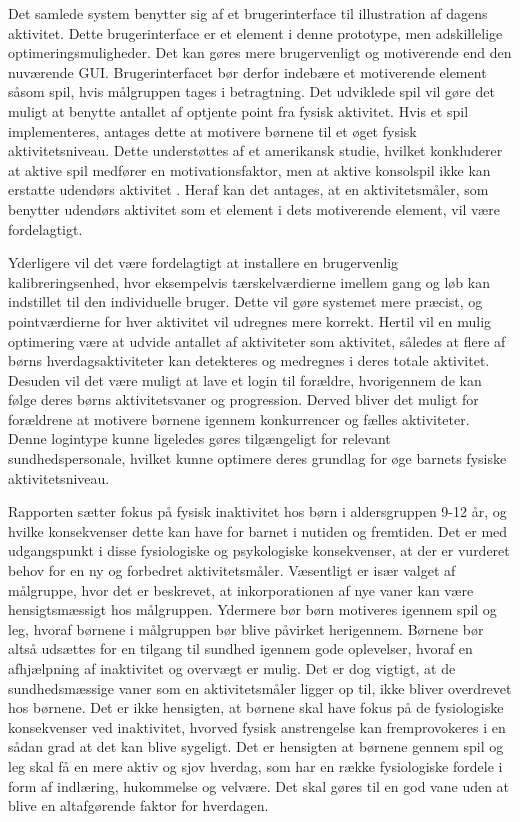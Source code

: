 Det samlede system benytter sig af et brugerinterface til illustration af dagens aktivitet. Dette brugerinterface er et element i denne prototype, men adskillelige optimeringsmuligheder. Det kan gøres mere brugervenligt og motiverende end den nuværende GUI. Brugerinterfacet bør derfor indebære et motiverende element såsom spil, hvis målgruppen tages i betragtning. Det udviklede spil vil gøre det muligt at benytte antallet af optjente point fra fysisk aktivitet. Hvis et spil implementeres, antages dette at motivere børnene til et øget fysisk aktivitetsniveau. Dette understøttes af et amerikansk studie, hvilket konkluderer at aktive spil medfører en motivationsfaktor, men at aktive konsolspil ikke kan erstatte udendørs aktivitet \citep{Oestergaard2012}. Heraf kan det antages, at en aktivitetsmåler, som benytter udendørs aktivitet som et element i dets motiverende element, vil være fordelagtigt.

Yderligere vil det være fordelagtigt at installere en brugervenlig kalibreringsenhed, hvor eksempelvis tærskelværdierne imellem gang og løb kan indstillet til den individuelle bruger. Dette vil gøre systemet mere præcist, og pointværdierne for hver aktivitet vil udregnes mere korrekt. Hertil vil en mulig optimering være at udvide antallet af aktiviteter som aktivitet, således at flere af børns hverdagsaktiviteter kan detekteres og medregnes i deres totale aktivitet. Desuden vil det være muligt at lave et login til forældre, hvorigennem de kan følge deres børns aktivitetsvaner og progression. Derved bliver det muligt for forældrene at motivere børnene igennem konkurrencer og fælles aktiviteter. Denne logintype kunne ligeledes gøres tilgængeligt for relevant sundhedspersonale, hvilket kunne optimere deres grundlag for øge barnets fysiske aktivitetsniveau.

Rapporten sætter fokus på fysisk inaktivitet hos børn i aldersgruppen 9-12 år, og hvilke konsekvenser dette kan have for barnet i nutiden og fremtiden. Det er med udgangspunkt i disse fysiologiske og psykologiske konsekvenser, at der er vurderet behov for en ny og forbedret aktivitetsmåler. Væsentligt er især valget af målgruppe, hvor det er beskrevet, at inkorporationen af nye vaner kan være hensigtsmæssigt hos målgruppen. Ydermere bør børn motiveres igennem spil og leg, hvoraf børnene i målgruppen bør blive påvirket herigennem. Børnene bør altså udsættes for en tilgang til sundhed igennem gode oplevelser, hvoraf en afhjælpning af inaktivitet og overvægt er mulig. Det er dog vigtigt, at de sundhedsmæssige vaner som en aktivitetsmåler ligger op til, ikke bliver overdrevet hos børnene. Det er ikke hensigten, at børnene skal have fokus på de fysiologiske konsekvenser ved inaktivitet, hvorved fysisk anstrengelse kan fremprovokeres i en sådan grad at det kan blive sygeligt. Det er hensigten at børnene gennem spil og leg skal få en mere aktiv og sjov hverdag, som har en række fysiologiske fordele i form af indlæring, hukommelse og velvære. Det skal gøres til en god vane uden at blive en altafgørende faktor for hverdagen.








